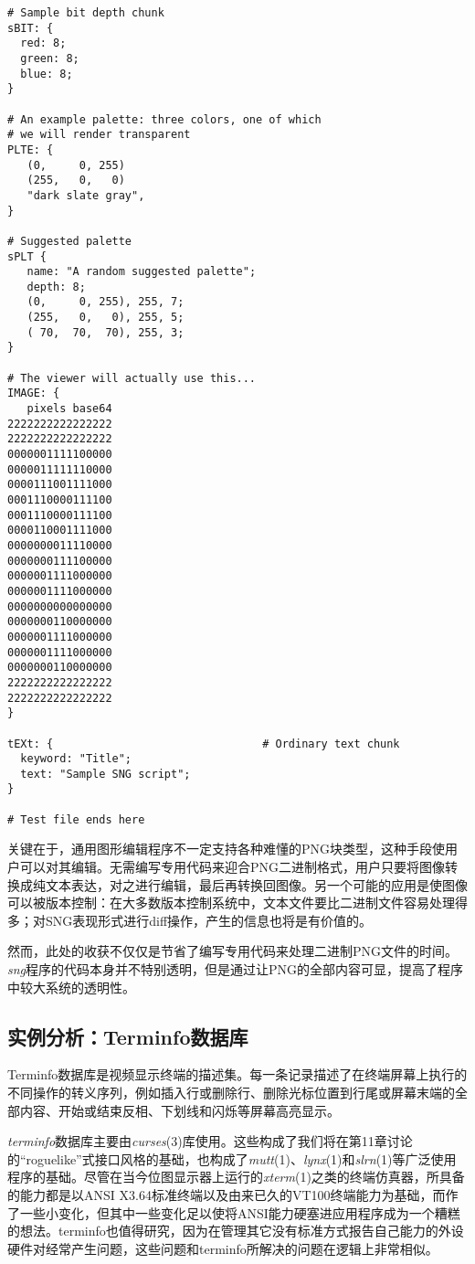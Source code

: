 \documentclass[12pt,oneside]{book}
\begin{document}
\begin{common-format}
\begin{Verbatim}[label=例6.2  SNG实例]
# Sample bit depth chunk
sBIT: {
  red: 8;
  green: 8;
  blue: 8;
}

# An example palette: three colors, one of which 
# we will render transparent 
PLTE: {
   (0,     0, 255)
   (255,   0,   0)
   "dark slate gray",
}

# Suggested palette
sPLT {
   name: "A random suggested palette";
   depth: 8;
   (0,     0, 255), 255, 7;
   (255,   0,   0), 255, 5;
   ( 70,  70,  70), 255, 3;
}

# The viewer will actually use this...
IMAGE: {
   pixels base64
2222222222222222
2222222222222222
0000001111100000
0000011111110000
0000111001111000
0001110000111100
0001110000111100
0000110001111000
0000000011110000
0000000111100000
0000001111000000
0000001111000000
0000000000000000
0000000110000000
0000001111000000
0000001111000000
0000000110000000
2222222222222222
2222222222222222
}

tEXt: {                                # Ordinary text chunk
  keyword: "Title";
  text: "Sample SNG script";
}

# Test file ends here

\end{Verbatim}

关键在于，通用图形编辑程序不一定支持各种难懂的PNG块类型，这种手段使用户可以对其编辑。无需编写专用代码来迎合PNG二进制格式，用户只要将图像转换成纯文本表达，对之进行编辑，最后再转换回图像。另一个可能的应用是使图像可以被版本控制：在大多数版本控制系统中，文本文件要比二进制文件容易处理得多；对SNG表现形式进行diff操作，产生的信息也将是有价值的。

然而，此处的收获不仅仅是节省了编写专用代码来处理二进制PNG文件的时间。\textit{sng}程序的代码本身并不特别透明，但是通过让PNG的全部内容可显，提高了程序中较大系统的透明性。


\subsection{实例分析：Terminfo数据库}
Terminfo数据库是视频显示终端的描述集。每一条记录描述了在终端屏幕上执行的不同操作的转义序列，例如插入行或删除行、删除光标位置到行尾或屏幕末端的全部内容、开始或结束反相、下划线和闪烁等屏幕高亮显示。

\textit{terminfo}数据库主要由\textit{curses}(3)库使用。这些构成了我们将在第11章讨论的“roguelike”式接口风格的基础，也构成了\textit{mutt}(1)、\textit{lynx}(1)和\textit{slrn}(1)等广泛使用程序的基础。尽管在当今位图显示器上运行的\textit{xterm}(1)之类的终端仿真器，所具备的能力都是以ANSI X3.64标准终端以及由来已久的VT100终端能力为基础，而作了一些小变化，但其中一些变化足以使将ANSI能力硬塞进应用程序成为一个糟糕的想法。terminfo也值得研究，因为在管理其它没有标准方式报告自己能力的外设硬件对经常产生问题，这些问题和terminfo所解决的问题在逻辑上非常相似。


\end{common-format}
\end{document}

